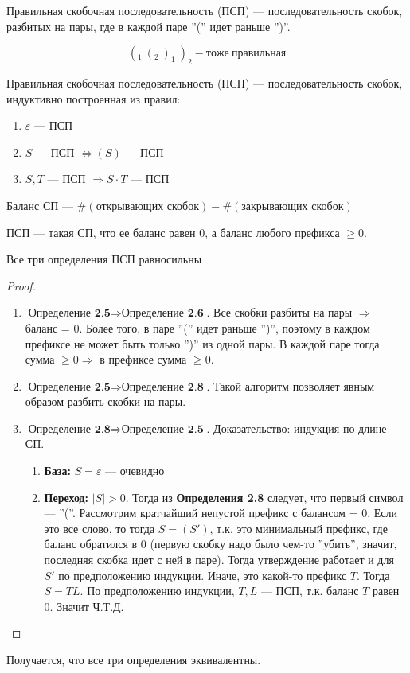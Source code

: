 \begin{definition}
    Правильная скобочная последовательность (ПСП) --- последовательность скобок, разбитых на пары, где в каждой паре ''('' идет раньше '')''.
\end{definition}
$$(_1\ (_2\ )_1\ )_2 - тоже\ правильная$$

\begin{definition}
    Правильная скобочная последовательность (ПСП) --- последовательность скобок, индуктивно построенная из правил: 
\end{definition}
\begin{enumerate}
    \item $\varepsilon$ --- ПСП
    \item $S$ --- ПСП $\Leftrightarrow (S)$ --- ПСП
    \item $S, T$ --- ПСП $\Rightarrow S\cdot T$ --- ПСП
\end{enumerate}

\begin{definition}
    Баланс СП --- \(\#(\text{открывающих скобок}) - \#(\text{закрывающих скобок})\)
\end{definition}

\begin{definition}
    ПСП --- такая СП, что ее баланс равен 0, а баланс любого префикса $\ge 0$.
\end{definition}
\begin{proposition}
    Все три определения ПСП равносильны
\end{proposition}
\begin{proof}
\indent
    \begin{enumerate}
        \item $\textbf{Определение 2.5} \Rightarrow \textbf{Определение 2.6}$. Все скобки разбиты на пары $\Rightarrow$ баланс = 0. Более того, в паре ''('' идет раньше '')'', поэтому в каждом префиксе не может быть только '')'' из одной пары. В каждой паре тогда сумма $\ge 0 \Rightarrow$ в префиксе сумма $\ge 0$. 
        \item $\textbf{Определение 2.5} \Rightarrow \textbf{Определение 2.8}$. Такой алгоритм позволяет явным образом разбить скобки на пары.
        \item $\textbf{Определение 2.8} \Rightarrow \textbf{Определение 2.5}$. Доказательство: индукция по длине СП.
        \begin{enumerate}
            \item[] \textbf{База:} $S = \varepsilon$ --- очевидно 
            \item[] \textbf{Переход:} $|S| > 0$. Тогда из \textbf{Определения 2.8} следует, что первый символ --- ''(''. Рассмотрим кратчайший непустой префикс с балансом = 0. Если это все слово, то тогда $S = (S')$, т.к. это минимальный префикс, где баланс обратился в 0 (первую скобку надо было чем-то ''убить'', значит, последняя скобка идет с ней в паре). Тогда утверждение работает и для $S'$ по предположению индукции. Иначе, это какой-то префикс $T$. Тогда $S = TL$. По предположению индукции, $T, L$ --- ПСП, т.к. баланс $T$ равен 0. Значит Ч.Т.Д.
        \end{enumerate}
    \end{enumerate}
\end{proof}
Получается, что все три определения эквивалентны.